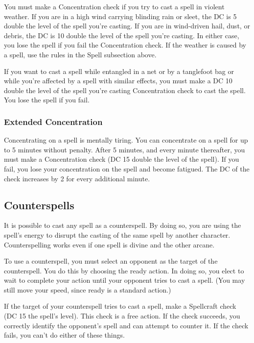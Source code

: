  You must make a Concentration check if you try to cast a spell in violent weather. If you are in a high wind carrying blinding rain or sleet, the DC is 5 \add double the level of the spell you're casting. If you are in wind-driven hail, dust, or debris, the DC is 10 \add double the level of the spell you're casting. In either case, you lose the spell if you fail the Concentration check. If the weather is caused by a spell, use the rules in the Spell subsection above.

 If you want to cast a spell while entangled in a net or by a tanglefoot bag or while you're affected by a spell with similar effects, you must make a DC 10 \add double the level of the spell you're casting Concentration check to cast the spell. You lose the spell if you fail.

\subsubsection{Extended Concentration}
Concentrating on a spell is mentally tiring. You can concentrate on a spell for up to 5 minutes without penalty. After 5 minutes, and every minute thereafter, you must make a Concentration check (DC 15 \add double the level of the spell). If you fail, you lose your concentration on the spell and become fatigued. The DC of the check increases by 2 for every additional minute.

\subsection{Counterspells}
It is possible to cast any spell as a counterspell. By doing so, you are using the spell's energy to disrupt the casting of the same spell by another character. Counterspelling works even if one spell is divine and the other arcane.

 To use a counterspell, you must select an opponent as the target of the counterspell. You do this by choosing the ready action. In doing so, you elect to wait to complete your action until your opponent tries to cast a spell. (You may still move your speed, since ready is a standard action.)

If the target of your counterspell tries to cast a spell, make a Spellcraft check (DC 15 \add the spell's level). This check is a free action. If the check succeeds, you correctly identify the opponent's spell and can attempt to counter it. If the check fails, you can't do either of these things.

